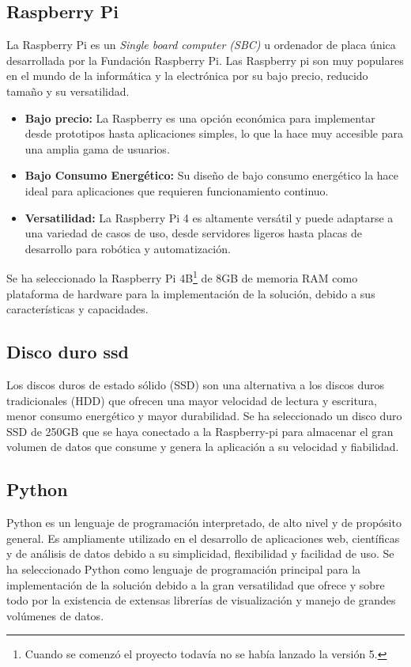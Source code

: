 \subsection{Raspberry Pi}

La Raspberry Pi es un \textit{Single board computer (SBC)} u ordenador de placa única desarrollada por la Fundación Raspberry Pi. Las Raspberry pi son muy populares en el mundo de la informática y la electrónica por su bajo precio, reducido tamaño y su versatilidad.

\begin{itemize}
	\item \textbf{Bajo precio:} La Raspberry es una opción económica para implementar desde prototipos hasta aplicaciones simples, lo que la hace muy accesible para una amplia gama de usuarios.
	\item \textbf{Bajo Consumo Energético:} Su diseño de bajo consumo energético la hace ideal para aplicaciones que requieren funcionamiento continuo.
	\item \textbf{Versatilidad:} La Raspberry Pi 4 es altamente versátil y puede adaptarse a una variedad de casos de uso, desde servidores ligeros hasta placas de desarrollo para robótica y automatización.
\end{itemize}
Se ha seleccionado la Raspberry Pi 4B\footnote{Cuando se comenzó el proyecto todavía no se había lanzado la versión 5.} de 8GB de memoria RAM como plataforma de hardware para la implementación de la solución, debido a sus características y capacidades.

\subsection{Disco duro ssd}
Los discos duros de estado sólido (SSD) son una alternativa a los discos duros tradicionales (HDD) que ofrecen una mayor velocidad de lectura y escritura, menor consumo energético y mayor durabilidad. Se ha seleccionado un disco duro SSD de 250GB que se haya conectado a la Raspberry-pi para almacenar el gran volumen de datos que consume y genera la aplicación a su velocidad y fiabilidad.

\subsection{Python}
Python es un lenguaje de programación interpretado, de alto nivel y de propósito general. Es ampliamente utilizado en el desarrollo de aplicaciones web, científicas y de análisis de datos debido a su simplicidad, flexibilidad y facilidad de uso. Se ha seleccionado Python como lenguaje de programación principal para la implementación de la solución debido a la gran versatilidad que ofrece y sobre todo por la existencia de extensas librerías de visualización y manejo de grandes volúmenes de datos.

